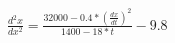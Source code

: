 \documentclass[10pt]{article}
\begin{document}
$\frac{d^{2}x}{dx^{2}}=\frac{32000-0.4*(\frac{dx}{dt})^{2}}{1400-18*t}-9.8$
\end{document}
